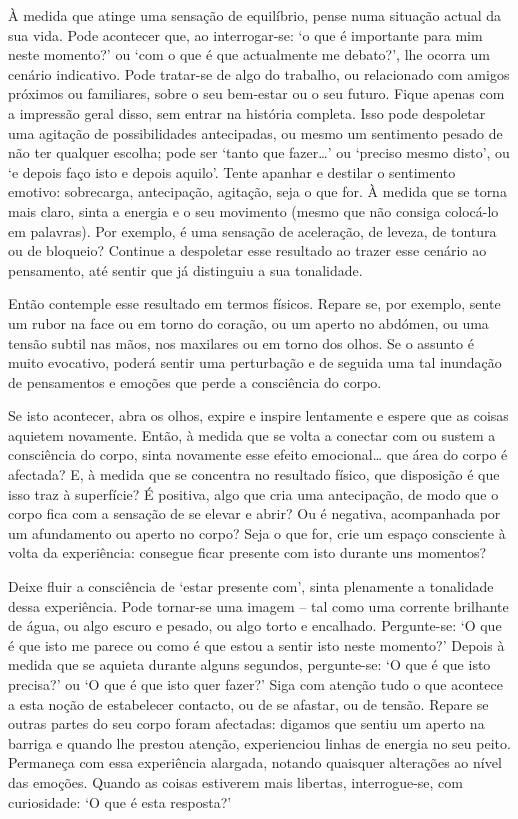 À medida que atinge uma sensação de equilíbrio, pense numa situação actual da sua vida. Pode acontecer que, ao interrogar-se: `o que é importante para mim neste momento?' ou `com o que é que actualmente me debato?', lhe ocorra um cenário indicativo. Pode tratar-se de algo do trabalho, ou relacionado com amigos próximos ou familiares, sobre o seu bem-estar ou o seu futuro. Fique apenas com a impressão geral disso, sem entrar na história completa. Isso pode despoletar uma agitação de possibilidades antecipadas, ou mesmo um sentimento pesado de não ter qualquer escolha; pode ser `tanto que fazer\ldots{}' ou `preciso mesmo disto', ou `e depois faço isto e depois aquilo'. Tente apanhar e destilar o sentimento emotivo: sobrecarga, antecipação, agitação, seja o que for. À medida que se torna mais claro, sinta a energia e o seu movimento (mesmo que não consiga colocá-lo em palavras). Por exemplo, é uma sensação de aceleração, de leveza, de tontura ou de bloqueio? Continue a despoletar esse resultado ao trazer esse cenário ao pensamento, até sentir que já distinguiu a sua tonalidade.

Então contemple esse resultado em termos físicos. Repare se, por exemplo, sente um rubor na face ou em torno do coração, ou um aperto no abdómen, ou uma tensão subtil nas mãos, nos maxilares ou em torno dos olhos. Se o assunto é muito evocativo, poderá sentir uma perturbação e de seguida uma tal inundação de pensamentos e emoções que perde a consciência do corpo.

Se isto acontecer, abra os olhos, expire e inspire lentamente e espere que as coisas aquietem novamente. Então, à medida que se volta a conectar com ou sustem a consciência do corpo, sinta novamente esse efeito emocional\ldots{} que área do corpo é afectada? E, à medida que se concentra no resultado físico, que disposição é que isso traz à superfície? É positiva, algo que cria uma antecipação, de modo que o corpo fica com a sensação de se elevar e abrir? Ou é negativa, acompanhada por um afundamento ou aperto no corpo? Seja o que for, crie um espaço consciente à volta da experiência: consegue ficar presente com isto durante uns momentos?

Deixe fluir a consciência de `estar presente com', sinta plenamente a tonalidade dessa experiência. Pode tornar-se uma imagem -- tal como uma corrente brilhante de água, ou algo escuro e pesado, ou algo torto e encalhado. Pergunte-se: `O que é que isto me parece ou como é que estou a sentir isto neste momento?' Depois à medida que se aquieta durante alguns segundos, pergunte-se: `O que é que isto precisa?' ou `O que é que isto quer fazer?' Siga com atenção tudo o que acontece a esta noção de estabelecer contacto, ou de se afastar, ou de tensão. Repare se outras partes do seu corpo foram afectadas: digamos que sentiu um aperto na barriga e quando lhe prestou atenção, experienciou linhas de energia no seu peito. Permaneça com essa experiência alargada, notando quaisquer alterações ao nível das emoções. Quando as coisas estiverem mais libertas, interrogue-se, com curiosidade: `O que é esta resposta?'

